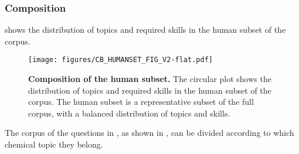 \subsubsection{Composition}

 shows the distribution of topics and required skills in the human subset of the \chembench corpus.

\begin{figure}
    \centering
    \texttt{[image: figures/CB\_HUMANSET\_FIG\_V2-flat.pdf]}
    \caption{\textbf{Composition of the human subset.} The circular plot shows the distribution of topics and required skills in the human subset of the \chembench corpus. The human subset is a representative subset of the full corpus, with a balanced distribution of topics and skills.}
    \label{fig:cb_humanset}
\end{figure}

The corpus of the questions in \chembench, as shown in , can be divided according to which chemical topic they belong.

